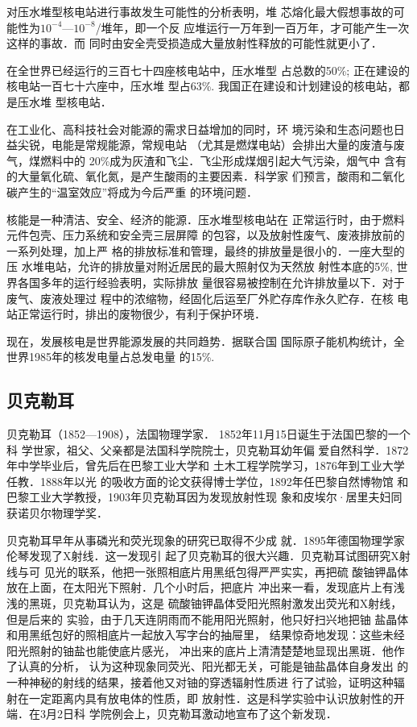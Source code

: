 对压水堆型核电站进行事故发生可能性的分析表明，堆
芯熔化最大假想事故的可能性为$10^{-4}$—$10^{-8}$/堆年，即一个反
应堆运行一万年到一百万年，才可能产生一次这样的事故．而
同时由安全壳受损造成大量放射性释放的可能性就更小了．

在全世界已经运行的三百七十四座核电站中，压水堆型
占总数的50\%; 正在建设的核电站一百七十六座中，压水堆
型占63\%. 我国正在建设和计划建设的核电站，都是压水堆
型核电站．

在工业化、高科技社会对能源的需求日益增加的同时，环
境污染和生态问题也日益尖锐，电能是常规能源，常规电站
（尤其是燃煤电站）会排出大量的废渣与废气，煤燃料中的
20\%成为灰渣和飞尘．飞尘形成煤烟引起大气污染，烟气中
含有的大量氧化硫、氧化氮，是产生酸雨的主要因素．科学家
们预言，酸雨和二氧化碳产生的“温室效应”将成为今后严重
的环境问题．

核能是一种清洁、安全、经济的能源．压水堆型核电站在
正常运行时，由于燃料元件包壳、压力系统和安全壳三层屏障
的包容，以及放射性废气、废液排放前的一系列处理，加上严
格的排放标准和管理，最终的排放量是很小的．一座大型的压
水堆电站，允许的排放量对附近居民的最大照射仅为天然放
射性本底的5\%, 世界各国多年的运行经验表明，实际排放
量很容易被控制在允许排放量以下．对于废气、废液处理过
程中的浓缩物，经固化后运至厂外贮存库作永久贮存．在核
电站正常运行时，排出的废物很少，有利于保护环境．

现在，发展核电是世界能源发展的共同趋势．据联合国
国际原子能机构统计，全世界1985年的核发电量占总发电量
的15\%. 

\subsection{贝克勒耳}
贝克勒耳（1852—1908），法国物理学家．
1852年11月15日诞生于法国巴黎的一个科
学世家，祖父、父亲都是法国科学院院士，贝克勒耳幼年偏
爱自然科学．1872年中学毕业后，曾先后在巴黎工业大学和
土木工程学院学习，1876年到工业大学任教．1888年以光
的吸收方面的论文获得博士学位，1892年任巴黎自然博物馆
和巴黎工业大学教授，1903年贝克勒耳因为发现放射性现
象和皮埃尔·居里夫妇同获诺贝尔物理学奖．

贝克勒耳早年从事磷光和荧光现象的研究已取得不少成
就．1895年德国物理学家伦琴发现了X射线．这一发现引
起了贝克勒耳的很大兴趣．贝克勒耳试图研究X射线与可
见光的联系，他把一张照相底片用黑纸包得严严实实，再把硫
酸铀钾晶体放在上面，在太阳光下照射．几个小时后，把底片
冲出来一看，发现底片上有浅浅的黑斑，贝克勒耳认为，这是
硫酸铀钾晶体受阳光照射激发出荧光和X射线，但是后来的
实验，由于几天连阴雨而不能用阳光照射，他只好扫兴地把铀
盐晶体和用黑纸包好的照相底片一起放入写字台的抽屉里，
结果惊奇地发现：这些未经阳光照射的铀盐也能使底片感光，
冲出来的底片上清清楚楚地显现出黑斑．他作了认真的分析，
认为这种现象同荧光、阳光都无关，可能是铀盐晶体自身发出
的一种神秘的射线的结果，接着他又对铀的穿透辐射性质进
行了试验，证明这种辐射在一定距离内具有放电体的性质，即
放射性．这是科学实验中认识放射性的开端．在3月2日科
学院例会上，贝克勒耳激动地宣布了这个新发现．

